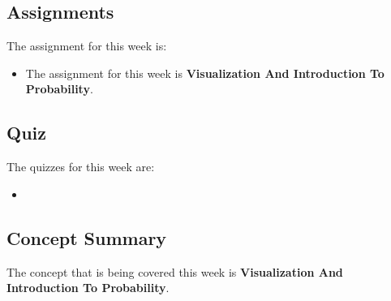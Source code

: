 \subsection{Assignments}

The assignment for this week is:

\begin{itemize}
    \item The assignment for this week is \textbf{Visualization And Introduction To Probability}. 
\end{itemize}

\subsection{Quiz}

The quizzes for this week are:

\begin{itemize}
    \item {} \textbullet {} 
\end{itemize}

\subsection{Concept Summary}

The concept that is being covered this week is \textbf{Visualization And Introduction To Probability}.

